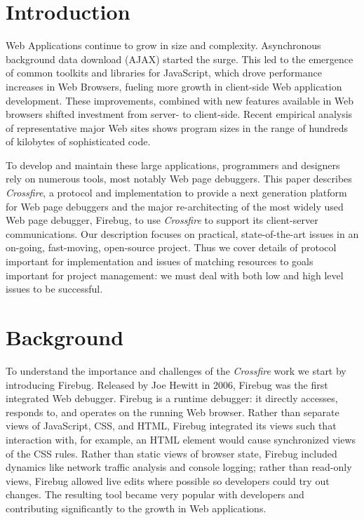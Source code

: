 
\section{Introduction}
Web Applications continue to grow in size and complexity. Asynchronous
background data download (AJAX) started the surge. This led to the emergence of
common toolkits and libraries for JavaScript, which drove  performance increases
in Web Browsers, fueling more growth in client-side Web application development.
These improvements, combined with new features available in Web browsers shifted
investment from server- to client-side. Recent empirical analysis of
representative
 major Web sites shows program sizes in the range of hundreds of kilobytes of
sophisticated code.\cite{VitekDynamicJS2010}

To develop and maintain these large applications, programmers and designers rely
on numerous tools, most notably Web page debuggers. This paper describes
\textit{Crossfire}, a protocol and implementation to provide a next generation
platform for Web page debuggers and the major re-architecting of the most widely used Web
page debugger, Firebug, to use \textit{Crossfire} to support its client-server
communications. Our description focuses on practical, state-of-the-art issues in
an on-going, fast-moving, open-source project. Thus we cover details of protocol
important for implementation and issues of matching resources to goals important
for project management: we must deal with both low and high level issues to
be successful.

\section{Background}
To understand the importance and challenges of the \textit{Crossfire} work we
start by introducing Firebug. Released by Joe Hewitt in 2006, Firebug was the
first integrated Web debugger. Firebug is a runtime debugger: it directly
accesses, responds to, and operates on the running Web browser.  Rather than
separate views of JavaScript, CSS, and HTML, Firebug integrated its views such
that interaction with, for example, an HTML element would cause synchronized
views of the CSS rules. Rather than static
 views of browser state, Firebug included dynamics like network traffic analysis
 and console logging; rather
than read-only views, Firebug allowed live edits where possible so developers
could try out changes. The resulting tool became very popular with developers
and contributing significantly to the growth in Web applications.

